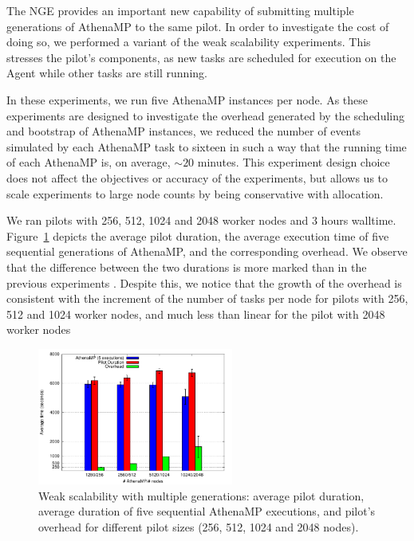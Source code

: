 The NGE provides an important new capability of submitting multiple
generations of AthenaMP to the same pilot. In order to investigate the cost of
doing so, we performed a variant of the weak scalability experiments. This
stresses the pilot's components, as new tasks are scheduled for execution on
the Agent while other tasks are still running.


In these experiments, we run five AthenaMP instances per node.  As these
experiments are designed to investigate the overhead generated by the
scheduling and bootstrap of AthenaMP instances, we reduced the number of
events simulated by each AthenaMP task to sixteen in such a way that the
running time of each AthenaMP is, on average, $\sim 20$ minutes. This
experiment design choice does not affect the  objectives or accuracy of the
experiments, but allows us to scale experiments to large node counts by being
conservative with allocation.


We ran
pilots
with 256, 512, 1024 and 2048 worker nodes and
3 hours walltime. Figure~\ref{fig:weakScal2a} depicts the average
pilot duration, the average execution time of five sequential
generations of AthenaMP, and the corresponding overhead. We
observe that the difference between the two durations is more marked than in the
previous experiments . Despite this, we notice that the growth of the overhead is consistent with the increment of the number of tasks per node for pilots with 256, 512 and 1024 worker nodes, and much less than linear for the pilot with 2048 worker nodes  

\begin{figure}[!htb]
        \includegraphics[height=4.5cm,width=\columnwidth]{./figures/NGE/weak2.pdf}
    \caption{Weak scalability with multiple generations: average pilot
    duration, average duration of five sequential AthenaMP executions, and
    pilot's overhead for different pilot sizes (256, 512, 1024 and 2048 nodes).}
\label{fig:weakScal2a}
\end{figure}


